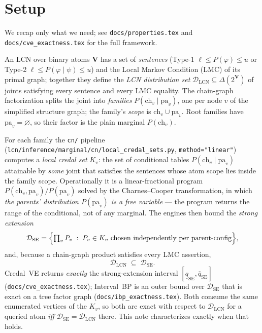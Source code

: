 \documentclass[11pt]{article}
\newcommand{\lo}{\underline}
\newcommand{\hi}{\overline}
\newcommand{\DSE}{\mathcal{D}_{\mathrm{SE}}}
\newcommand{\DLCN}{\mathcal{D}_{\mathrm{LCN}}}
\newcommand{\ch}{\mathrm{ch}}
\newcommand{\pa}{\mathrm{pa}}
\begin{document}
\tableofcontents

\section{Setup}\label{sec:setup}

We recap only what we need; see \texttt{docs/properties.tex} and \texttt{docs/cve\_exactness.tex} for
the full framework.

An LCN over binary atoms $\mathbf V$ has a set of \emph{sentences} (Type-1 $\ell\le P(\varphi)\le u$
or Type-2 $\ell\le P(\varphi\mid\psi)\le u$) and the Local Markov Condition (LMC) of its primal graph;
together they define the \emph{LCN distribution set} $\DLCN\subseteq\Delta(2^{\mathbf V})$ of joints
satisfying every sentence and every LMC equality. The chain-graph factorization splits the joint into
\emph{families} $P(\ch_v\mid\pa_v)$, one per node $v$ of the simplified structure graph; the family's
\emph{scope} is $\ch_v\cup\pa_v$. Root families have $\pa_v=\varnothing$, so their factor is the plain
marginal $P(\ch_v)$.

For each family the \texttt{cn/} pipeline (\texttt{lcn/inference/marginal/cn/local\_credal\_sets.py},
\texttt{method="linear"}) computes a \emph{local credal set} $K_v$: the set of conditional tables
$P(\ch_v\mid\pa_v)$ attainable by \emph{some} joint that satisfies the sentences whose atom scope lies
inside the family scope. Operationally it is a linear-fractional program
$P(\ch_v,\pa_v)/P(\pa_v)$ solved by the Charnes--Cooper transformation, in which \emph{the parents'
distribution $P(\pa_v)$ is a free variable} --- the program returns the range of the conditional, not
of any marginal. The engines then bound the \emph{strong extension}
\begin{equation}\label{eq:se}
  \DSE=\Bigl\{\textstyle\prod_v P_v \;:\; P_v\in K_v \text{ chosen independently per parent-config}\Bigr\},
\end{equation}
and, because a chain-graph product satisfies every LMC assertion,
\begin{equation}\label{eq:incl}
  \DLCN\;\subseteq\;\DSE .
\end{equation}
Credal~VE returns \emph{exactly} the strong-extension interval $[\lo q_{\mathrm{SE}},\hi
q_{\mathrm{SE}}]$ (\texttt{docs/cve\_exactness.tex}); Interval~BP is an outer bound over $\DSE$ that is
exact on a tree factor graph (\texttt{docs/ibp\_exactness.tex}). Both consume the same enumerated
vertices of the $K_v$, so both are exact with respect to $\DLCN$ for a queried atom \emph{iff}
$\DSE=\DLCN$ there. This note characterizes exactly when that holds.
\end{document}
